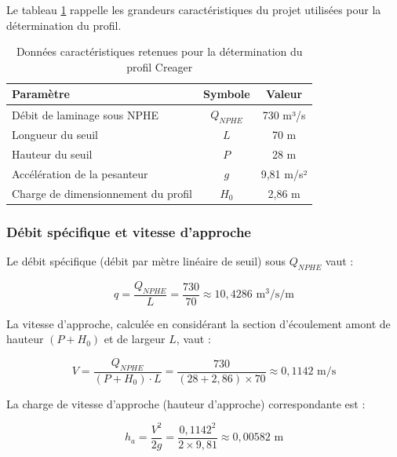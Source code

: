Le tableau \ref{tab:parametres_creager} rappelle les grandeurs caractéristiques du projet utilisées pour la détermination du profil.

\begin{table}[H]
    \centering
    \caption{Données caractéristiques retenues pour la détermination du profil Creager}
    \label{tab:parametres_creager}
    \begin{tabular}{|l|c|c|}
        \hline
        \textbf{Paramètre} & \textbf{Symbole} & \textbf{Valeur} \\
        \hline
        Débit de laminage sous NPHE & $Q_{NPHE}$ & 730 m³/s \\
        \hline
        Longueur du seuil & $L$ & 70 m \\
        \hline
        Hauteur du seuil & $P$ & 28 m \\
        \hline
        Accélération de la pesanteur & $g$ & 9,81 m/s² \\
        \hline
        Charge de dimensionnement du profil & $H_0$ & 2,86 m \\
        \hline
    \end{tabular}
\end{table}

\subsubsection{Débit spécifique et vitesse d'approche}
\label{subsubsec:debit_specifique_vitesse}

Le débit spécifique (débit par mètre linéaire de seuil) sous $Q_{NPHE}$ vaut :

\begin{equation}
q = \frac{Q_{NPHE}}{L} = \frac{730}{70} \approx 10{,}4286 \text{ m}^3/\text{s/m}
\label{eq:debit_specifique_usace}
\end{equation}

La vitesse d'approche, calculée en considérant la section d'écoulement amont de hauteur $(P+H_0)$ et de largeur $L$, vaut :

\begin{equation}
V = \frac{Q_{NPHE}}{(P+H_0) \cdot L} = \frac{730}{(28+2{,}86)\times 70} \approx 0{,}1142 \text{ m/s}
\label{eq:vitesse_approche_usace}
\end{equation}

La charge de vitesse d'approche (hauteur d'approche) correspondante est :

\begin{equation}
h_a = \frac{V^2}{2g} = \frac{0{,}1142^2}{2\times 9{,}81} \approx 0{,}00582 \text{ m}
\label{eq:charge_vitesse_approche}
\end{equation}


